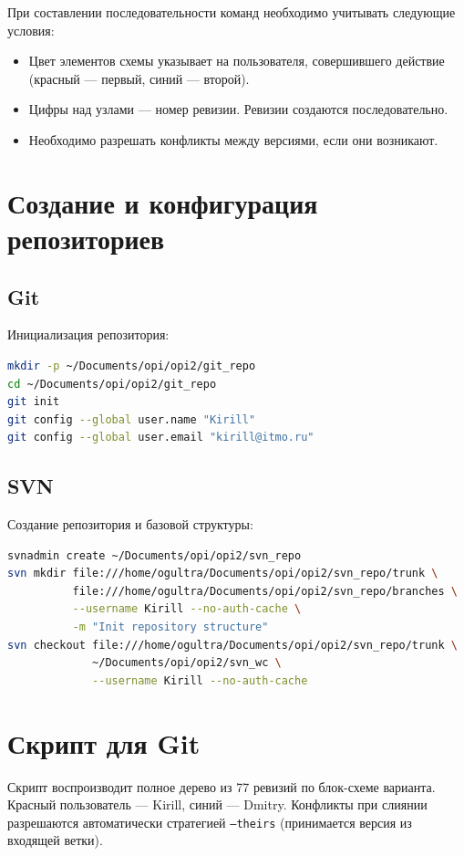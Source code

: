 \documentclass[12pt,a4paper]{article}
\begin{document}
При составлении последовательности команд необходимо учитывать следующие условия:
\begin{itemize}
    \item Цвет элементов схемы указывает на пользователя, совершившего действие (красный --- первый, синий --- второй).
    \item Цифры над узлами --- номер ревизии. Ревизии создаются последовательно.
    \item Необходимо разрешать конфликты между версиями, если они возникают.
\end{itemize}

\newpage
\section{Создание и конфигурация репозиториев}

\subsection{Git}

Инициализация репозитория:
\begin{lstlisting}[language=bash]
mkdir -p ~/Documents/opi/opi2/git_repo
cd ~/Documents/opi/opi2/git_repo
git init
git config --global user.name "Kirill"
git config --global user.email "kirill@itmo.ru"
\end{lstlisting}

\subsection{SVN}

Создание репозитория и базовой структуры:
\begin{lstlisting}[language=bash]
svnadmin create ~/Documents/opi/opi2/svn_repo
svn mkdir file:///home/ogultra/Documents/opi/opi2/svn_repo/trunk \
          file:///home/ogultra/Documents/opi/opi2/svn_repo/branches \
          --username Kirill --no-auth-cache \
          -m "Init repository structure"
svn checkout file:///home/ogultra/Documents/opi/opi2/svn_repo/trunk \
             ~/Documents/opi/opi2/svn_wc \
             --username Kirill --no-auth-cache
\end{lstlisting}

\newpage
\section{Скрипт для Git}

Скрипт воспроизводит полное дерево из 77 ревизий по блок-схеме варианта.
Красный пользователь --- Kirill, синий --- Dmitry.
Конфликты при слиянии разрешаются автоматически стратегией \texttt{--theirs}
(принимается версия из входящей ветки).
\end{document}

